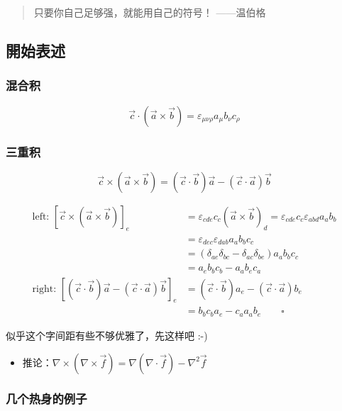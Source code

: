 \documentclass{article}
\begin{document}
\begin{quote}
    只要你自己足够强，就能用自己的符号！ ——温伯格
\end{quote}

\subsection{開始表述}

\subsubsection{混合积}

$$\vec{c}\cdot(\vec{a}\times\vec{b})=\varepsilon_{\mu\nu\rho}a_{\mu}b_{\nu}c_{\rho}$$

\subsubsection{三重积}

$$\vec{c}\times(\vec{a}\times\vec{b})=(\vec{c}\cdot\vec{b})\vec{a}-(\vec{c}\cdot\vec{a})\vec{b}$$
   
$$\begin{aligned}
   \text{left: }[\vec{c}\times(\vec{a}\times\vec{b})]_e&=\varepsilon_{cde}c_{c}(\vec{a}\times\vec{b})_{d}=\varepsilon_{cde}c_{c}\varepsilon_{abd}a_{a}b_{b}\\
   &=\varepsilon_{dec}\varepsilon_{dab}a_{a}b_{b}c_{c}\\
   &=(\delta_{ae}\delta_{bc}-\delta_{ac}\delta_{be})a_{a}b_{b}c_{c}\\
   &=a_{e}b_{b}c_{b}-a_{a}b_{e}c_{a}\\
   \text{right: }[(\vec{c}\cdot\vec{b})\vec{a}-(\vec{c}\cdot\vec{a})\vec{b}]_e&=(\vec{c}\cdot\vec{b})a_{e}-(\vec{c}\cdot\vec{a})b_{e}\\
   &=b_{b}c_{b}a_{e}-c_{a}a_ab_e\qquad\square
   \end{aligned}$$

似乎这个字间距有些不够优雅了，先这样吧 :-)

\begin{itemize}
    \item 推论：$\nabla\times(\nabla\times\vec{f})=\nabla(\nabla\cdot\vec{f})-\nabla^2\vec{f}$
\end{itemize}

\subsubsection{几个热身的例子}
\end{document}
